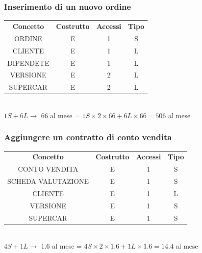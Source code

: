 \documentclass[12pt]{article}
\begin{document}
\subsubsection{Inserimento di un nuovo ordine} \label{Inserimento di un nuovo
ordine}

\begin{table}[H]
    \centering
    \begin{tabular}{ c c c c } 
        \rowcolor{red!20!}
        \textbf{Concetto} & \textbf{Costrutto} & \textbf{Accessi} &
        \textbf{Tipo}\\ 
        ORDINE & E & 1 & S \\ 
        CLIENTE & E & 1 & L \\ 
        DIPENDETE & E & 1 & L \\ 
        VERSIONE & E & 2 & L \\
        SUPERCAR & E & 2 & L \\ 
    \end{tabular}\\
    \( 1S + 6L \rightarrow \) 66 al mese = \( 1S \times 2 \times 66 + 6L \times
    66 = 506 \) al mese
\end{table}

\subsubsection{Aggiungere un contratto di conto vendita} \label{Aggiungere un
contratto di conto vendita}

\begin{table}[H]
    \centering
    \begin{tabular}{ c c c c } 
        \rowcolor{red!20!}
        \textbf{Concetto} & \textbf{Costrutto} & \textbf{Accessi} &
        \textbf{Tipo}\\ 
        CONTO VENDITA & E & 1 & S \\ 
        SCHEDA VALUTAZIONE & E & 1 & S \\ 
        CLIENTE & E & 1 & L \\ 
        VERSIONE & E & 1 & S \\ 
        SUPERCAR & E & 1 & S \\ 
    \end{tabular}\\
    \(4S + 1L \rightarrow \) 1.6 al mese = \( 4S \times 2 \times 1.6 + 1L \times
    1.6 = 14.4 \) al mese  
\end{table}
\end{document}
